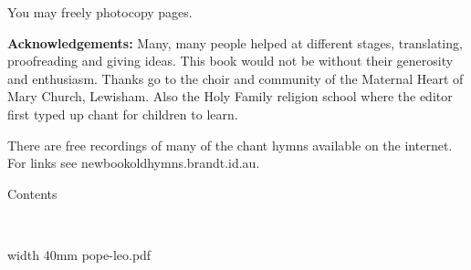 {You may freely photocopy pages.



{\bf Acknowledgements:}  Many, many people helped at different stages,
translating, proofreading and giving ideas.  This book would not
be without their generosity and enthusiasm.
Thanks go to the choir and community of the Maternal Heart of Mary
Church, Lewisham.  Also the Holy Family 
religion school where the editor first typed up chant for children
to learn. 

There are free recordings of many of the chant hymns available
on the internet.  For links see newbookoldhymns.brandt.id.au.



}

\eject

\centerline{\bigtype Contents}

\doubleline

\bigskip

\readtocfile

\vfill

\eject

\vfill
\eject


%






\ 

\vfill


\saveimageresource width 40mm {pope-leo.pdf}

\centerline{\useimageresource \lastsavedimageresourceindex}


